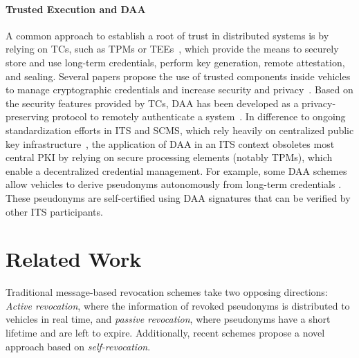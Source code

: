 \paragraph{Trusted Execution and DAA}
%
A common approach to establish a root of trust in distributed systems is by
relying on \acfp{TC}, such as \acp{TPM} or \acp{TEE}~\cite{maene:hardware},
which provide the means to securely store and use long-term credentials, perform
key generation, remote attestation, and sealing.
%
Several papers propose the use of trusted components inside vehicles to manage
cryptographic credentials and increase security and
privacy~\cite{guette2009vanet,wagan2010vanet,jangid2022towards}.
%
Based on the security features provided by \acp{TC}, \acf{DAA} has been
developed as a privacy-preserving protocol to remotely authenticate a
system~\cite{brickell2004direct,tpmdoc}. In difference to ongoing
standardization efforts in \ac{ITS} and \ac{SCMS}, which rely heavily on
centralized public key
infrastructure~\cite{etsi2021102940,etsi2022102941,brecht2018scms}, the
application of \ac{DAA} in an \ac{ITS} context obsoletes most central PKI by
relying on secure processing elements (notably \acp{TPM}), which enable a
decentralized credential management. For example, some \ac{DAA} schemes allow
vehicles to derive pseudonyms autonomously from long-term credentials
\cite{whitefield2017privacy,desmoulins2019practical}. These pseudonyms are
self-certified using \ac{DAA} signatures that can be verified by other \ac{ITS}
participants. 

\section{Related Work}
\label{related-work}

Traditional message-based revocation schemes take two opposing directions:
\emph{Active revocation}, where the information of revoked pseudonyms is
distributed to vehicles in real time, and \emph{passive revocation}, where
pseudonyms have a short lifetime and are left to expire. Additionally, recent
schemes propose a novel approach based on \emph{self-revocation}.

